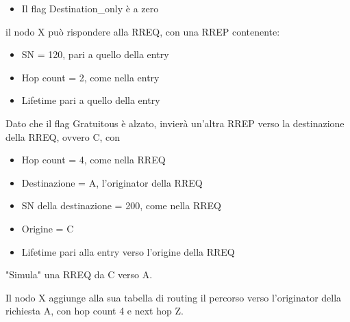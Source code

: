 \begin{questions}
\begin{solution}
\begin{itemize}
            \item Il flag Destination\_only è a zero
        \end{itemize}
        il nodo X può rispondere alla RREQ, con una RREP contenente: 
        \begin{itemize}
            \item SN = 120, pari a quello della entry
            
            \item Hop count = 2, come nella entry
            
            \item Lifetime pari a quello della entry
        \end{itemize}
        
        Dato che il flag Gratuitous è alzato, invierà un'altra RREP verso la destinazione della RREQ, ovvero C, con
        \begin{itemize}
            \item Hop count = 4, come nella RREQ
            
            \item Destinazione = A, l'originator della RREQ
            
            \item SN della destinazione = 200, come nella RREQ
            
            \item Origine = C
            
            \item Lifetime pari alla entry verso l'origine della RREQ
        \end{itemize}
        
        "Simula" una RREQ da C verso A.
        
        Il nodo X aggiunge alla sua tabella di routing il percorso verso l'originator della richiesta A, con hop count 4 e next hop Z.
    \end{solution}
\end{questions}